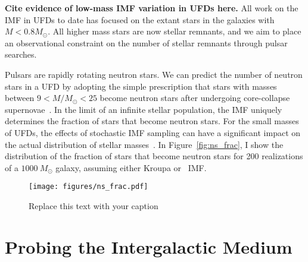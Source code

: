\documentclass[preprint]{/Users/jesse/tex/aastex_JRF}
\begin{document}
\textbf{Cite evidence of low-mass IMF variation in UFDs here.} All work on the IMF in UFDs to date has focused on the extant stars in the galaxies with $M < 0.8M_{\odot}$. All higher mass stars are now stellar remnants, and we aim to place an observational constraint on the number of stellar remnants through pulsar searches.

Pulsars are rapidly rotating neutron stars. We can predict the number of neutron stars in a UFD by adopting the simple prescription that stars with masses between $9 < M/M_{\odot} < 25$ become neutron stars after undergoing core-collapse supernovae~\citep{Heger03}. In the limit of an infinite stellar population, the IMF uniquely determines the fraction of stars that become neutron stars. For the small masses of UFDs, the effects of stochastic IMF sampling can have a significant impact on the actual distribution of stellar masses~\citep{Hernandez12}. In Figure~\ref{fig:ns_frac}, I show the distribution of the fraction of stars that become neutron stars for 200 realizations of a $1000~M_{\odot}$ galaxy, assuming either Kroupa or~\citet{Salpeter55} IMF.

\begin{figure}[h!]
\begin{center}
\texttt{[image: figures/ns\_frac.pdf]}
\caption{Replace this text with your caption}
\end{center}
\end{figure}



\section{Probing the Intergalactic Medium}

 

\end{document}
